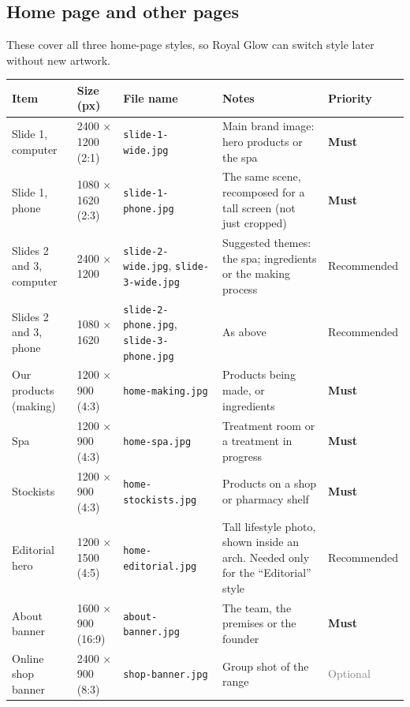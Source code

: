 \documentclass[11pt,a4paper]{article}
\newcommand{\key}[1]{{\footnotesize\texttt{#1}}}
\newcommand{\must}{\textbf{\textcolor{golddeep}{Must}}}
\newcommand{\rec}{Recommended}
\newcommand{\opt}{\textcolor{gray}{Optional}}
\begin{document}
\subsection{Home page and other pages}
These cover all three home-page styles, so Royal Glow can switch style later without new artwork.

\begin{longtable}{@{}P{3.2cm} P{2.1cm} P{3.9cm} P{3.75cm} l@{}}
\toprule
\textbf{Item} & \textbf{Size (px)} & \textbf{File name} & \textbf{Notes} & \textbf{Priority} \\ \midrule\endhead
Slide 1, computer & 2400 × 1200 (2:1) & \key{slide-1-wide.jpg} & Main brand image: hero products or the spa & \must \\
Slide 1, phone & 1080 × 1620 (2:3) & \key{slide-1-phone.jpg} & The same scene, recomposed for a tall screen (not just cropped) & \must \\
Slides 2 and 3, computer & 2400 × 1200 & \key{slide-2-wide.jpg}, \key{slide-3-wide.jpg} & Suggested themes: the spa; ingredients or the making process & \rec \\
Slides 2 and 3, phone & 1080 × 1620 & \key{slide-2-phone.jpg}, \key{slide-3-phone.jpg} & As above & \rec \\
Our products (making) & 1200 × 900 (4:3) & \key{home-making.jpg} & Products being made, or ingredients & \must \\
Spa & 1200 × 900 (4:3) & \key{home-spa.jpg} & Treatment room or a treatment in progress & \must \\
Stockists & 1200 × 900 (4:3) & \key{home-stockists.jpg} & Products on a shop or pharmacy shelf & \must \\
Editorial hero & 1200 × 1500 (4:5) & \key{home-editorial.jpg} & Tall lifestyle photo, shown inside an arch. Needed only for the ``Editorial'' style & \rec \\
About banner & 1600 × 900 (16:9) & \key{about-banner.jpg} & The team, the premises or the founder & \must \\
Online shop banner & 2400 × 900 (8:3) & \key{shop-banner.jpg} & Group shot of the range & \opt \\ \bottomrule
\end{longtable}
\end{document}
